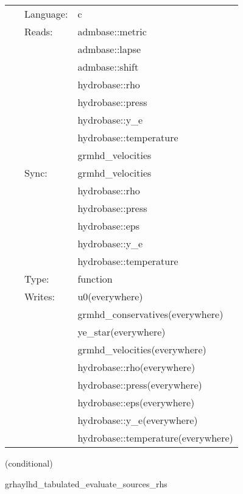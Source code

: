  \begin{tabular*}{160mm}{cll} 
~ & Language:  & c \\ 
~ & Reads:  & admbase::metric \\ 
~& ~ &admbase::lapse\\ 
~& ~ &admbase::shift\\ 
~& ~ &hydrobase::rho\\ 
~& ~ &hydrobase::press\\ 
~& ~ &hydrobase::y\_e\\ 
~& ~ &hydrobase::temperature\\ 
~& ~ &grmhd\_velocities\\ 
~ & Sync:  & grmhd\_velocities \\ 
~& ~ &hydrobase::rho\\ 
~& ~ &hydrobase::press\\ 
~& ~ &hydrobase::eps\\ 
~& ~ &hydrobase::y\_e\\ 
~& ~ &hydrobase::temperature\\ 
~ & Type:  & function \\ 
~ & Writes:  & u0(everywhere) \\ 
~& ~ &grmhd\_conservatives(everywhere)\\ 
~& ~ &ye\_star(everywhere)\\ 
~& ~ &grmhd\_velocities(everywhere)\\ 
~& ~ &hydrobase::rho(everywhere)\\ 
~& ~ &hydrobase::press(everywhere)\\ 
~& ~ &hydrobase::eps(everywhere)\\ 
~& ~ &hydrobase::y\_e(everywhere)\\ 
~& ~ &hydrobase::temperature(everywhere)\\ 
\end{tabular*} 


\vspace{5mm}

   (conditional) 

\hspace{5mm} grhaylhd\_tabulated\_evaluate\_sources\_rhs 

\hspace{5mm}{\it tabulated version of grhaylhd\_evaluate\_sources\_rhs } 


\hspace{5mm}

